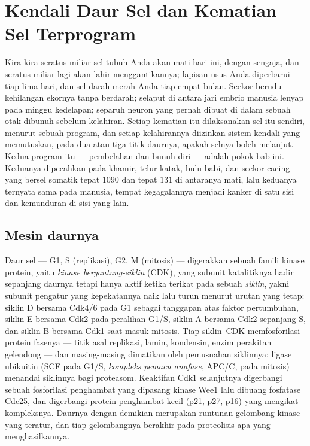\chapter{Kendali Daur Sel dan Kematian Sel Terprogram}\label{ch:b3:cell-cycle-apoptosis}

Kira-kira seratus miliar sel tubuh Anda akan mati hari ini, dengan sengaja,
dan seratus miliar lagi akan lahir menggantikannya; lapisan usus Anda
diperbarui tiap lima hari, dan sel darah merah Anda tiap empat bulan.
Seekor berudu kehilangan ekornya tanpa berdarah; selaput di antara jari embrio
manusia lenyap pada minggu kedelapan; separuh neuron yang pernah dibuat di
dalam sebuah otak dibunuh sebelum kelahiran. Setiap kematian itu dilaksanakan
sel itu sendiri, menurut sebuah program, dan setiap kelahirannya diizinkan
sistem kendali yang memutuskan, pada dua atau tiga titik daurnya, apakah selnya
boleh melanjut. Kedua program itu --- pembelahan dan bunuh diri --- adalah
pokok bab ini. Keduanya dipecahkan pada khamir, telur katak, bulu babi, dan
seekor cacing yang bersel somatik tepat $1090$ dan tepat $131$ di antaranya
mati, lalu keduanya ternyata sama pada manusia, tempat kegagalannya menjadi
kanker di satu sisi dan kemunduran di sisi yang lain.

\section{Mesin daurnya}

\begin{definition}\label{def:b3:cell-cycle-apoptosis:cdk}
%
Daur sel --- G1, S (replikasi), G2, M (mitosis) --- digerakkan sebuah famili
kinase protein, yaitu \emph{kinase bergantung-siklin} (CDK), yang subunit
katalitiknya hadir sepanjang daurnya tetapi hanya aktif ketika terikat pada
sebuah \emph{siklin}, yakni subunit pengatur yang kepekatannya naik lalu turun
menurut urutan yang tetap: siklin D bersama Cdk4/6 pada G1 sebagai tanggapan
atas faktor pertumbuhan, siklin E bersama Cdk2 pada peralihan G1/S, siklin A
bersama Cdk2 sepanjang S, dan siklin B bersama Cdk1 saat masuk mitosis. Tiap
siklin--CDK memfosforilasi protein fasenya --- titik asal replikasi, lamin,
kondensin, enzim perakitan gelendong --- dan masing-masing dimatikan oleh
pemusnahan siklinnya: ligase ubikuitin (SCF pada G1/S, \emph{kompleks pemacu
anafase}, APC/C, pada mitosis) menandai siklinnya bagi proteasom. Keaktifan
Cdk1 selanjutnya digerbangi sebuah fosforilasi penghambat yang dipasang kinase
Wee1 lalu dibuang fosfatase Cdc25, dan digerbangi protein penghambat kecil
(p21, p27, p16) yang mengikat kompleksnya. Daurnya dengan demikian merupakan
runtunan gelombang kinase yang teratur, dan tiap gelombangnya berakhir pada
proteolisis apa yang menghasilkannya.
\end{definition}

